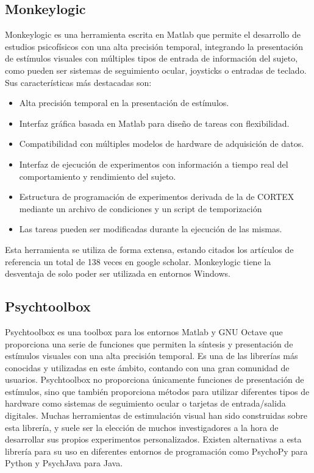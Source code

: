 \documentclass[conference]{IEEEtran}
\begin{document}
\subsection{Monkeylogic}

Monkeylogic\cite{monkeylogic} es una herramienta escrita en  Matlab que permite el desarrollo de estudios psicofísicos con una alta precisión temporal, integrando la presentación de estímulos visuales con múltiples tipos de entrada de información del sujeto, como pueden ser sistemas de seguimiento ocular, joysticks o entradas de teclado.
Sus características más destacadas son:
\begin{itemize}
	\item Alta precisión temporal en la presentación de estímulos. 
	\item Interfaz gráfica basada en Matlab para diseño de tareas con flexibilidad.
	\item Compatibilidad con múltiples modelos de hardware de adquisición de datos.
	\item Interfaz de ejecución de experimentos con información a tiempo real del comportamiento y rendimiento del sujeto.
	\item Estructura de programación de experimentos derivada de la de CORTEX\cite{cortex} mediante un archivo de condiciones y un script de temporización
	\item Las tareas pueden ser modificadas durante la ejecución de las mismas.
\end{itemize}
Esta herramienta se utiliza de forma extensa, estando citados los artículos de referencia un total de 138 veces en google scholar.
Monkeylogic tiene la desventaja de solo poder ser utilizada en entornos Windows.

\subsection{Psychtoolbox}

Psychtoolbox\cite{psychtoolbox} es una toolbox para los entornos Matlab y GNU Octave que proporciona una serie de funciones que permiten la síntesis y presentación de estímulos visuales con una alta precisión temporal. 
Es una de las librerías más conocidas y utilizadas en este ámbito, contando con una gran comunidad de usuarios.
Psychtoolbox no proporciona únicamente funciones de presentación de estímulos, sino que también proporciona métodos para utilizar diferentes tipos de hardware como sistemas de seguimiento ocular o tarjetas de entrada/salida digitales.
Muchas herramientas de estimulación visual \cite{opticka}\cite{wave} han sido construidas sobre esta librería, y suele ser la elección de muchos investigadores a la hora de desarrollar sus propios experimentos personalizados.
Existen alternativas a esta librería para su uso en diferentes entornos de programación como PsychoPy\cite{psychopy} para Python y PsychJava para Java.
\end{document}
